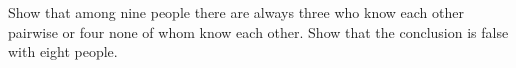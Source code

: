 Show that among nine people there are always three who know each other pairwise or four none of whom know each other. Show that the conclusion is false with eight people.
